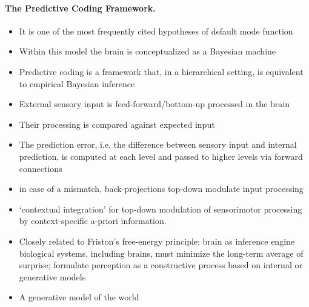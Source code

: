 \documentclass{article} %
\begin{document}
\paragraph{The Predictive Coding Framework.}
\begin{itemize}
  \item It is one of the most frequently cited hypotheses of default mode function
  \item Within this model the brain is conceptualized as a Bayesian machine
  \item Predictive coding is a framework that, in a hierarchical setting,
  is equivalent to empirical Bayesian inference
  \item External sensory input is feed-forward/bottom-up processed in the brain
  \item Their processing is compared against expected input
  \item The prediction error, i.e. the difference between sensory input
  and internal prediction, is computed at each level and passed to
  higher levels via forward connections
  \item in case of a mismatch, back-projections top-down modulate
  input processing
  \item ‘contextual integration’ for top-down modulation of sensorimotor
  processing by context-specific a-priori information.
  \item Closely related to Friston's free-energy principle: brain as inference engine
  biological systems, including brains, must minimize the long-term average of surprise;
  formulate perception as a constructive process based on internal or generative models
  \item A generative model of the world
\end{itemize}
\end{document}
